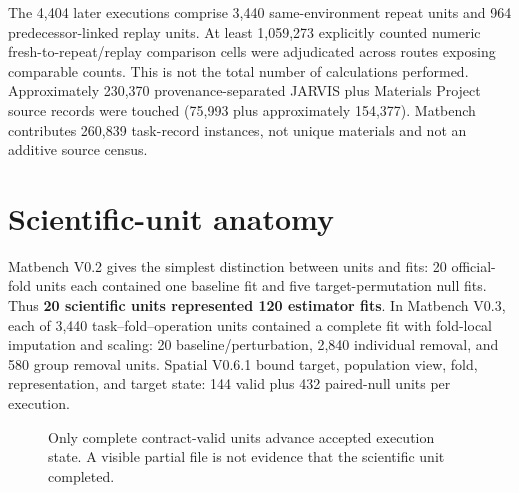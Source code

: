 The 4,404 later executions comprise 3,440 same-environment repeat units and 964 predecessor-linked replay units. At least 1,059,273 explicitly counted numeric fresh-to-repeat/replay comparison cells were adjudicated across routes exposing comparable counts. This is not the total number of calculations performed. Approximately 230,370 provenance-separated JARVIS plus Materials Project source records were touched (75,993 plus approximately 154,377). Matbench contributes 260,839 task-record instances, not unique materials and not an additive source census.

\section{Scientific-unit anatomy}
Matbench V0.2 gives the simplest distinction between units and fits: 20 official-fold units each contained one baseline fit and five target-permutation null fits. Thus \textbf{20 scientific units represented 120 estimator fits}. In Matbench V0.3, each of 3,440 task--fold--operation units contained a complete fit with fold-local imputation and scaling: 20 baseline/perturbation, 2,840 individual removal, and 580 group removal units. Spatial V0.6.1 bound target, population view, fold, representation, and target state: 144 valid plus 432 paired-null units per execution.

\begin{figure}[H]\centering
{}
\caption{Only complete contract-valid units advance accepted execution state. A visible partial file is not evidence that the scientific unit completed.}
\end{figure}

